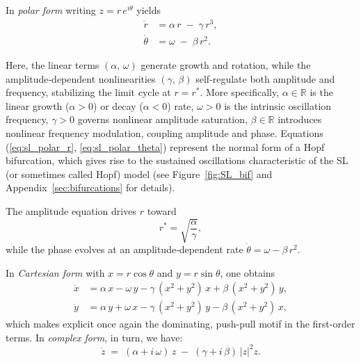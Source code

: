 \documentclass[11pt]{article}
\numberwithin{equation}{section}
\begin{document}
In \textit{polar form} writing \(z = r\,e^{i\theta}\) yields
\begin{align}
  \dot{r}      &= \alpha\,r \;-\; \gamma\,r^{3}, 
  \label{eq:sl_polar_r}\\
  \dot{\theta} &= \omega \;-\; \beta\,r^{2}.
  \label{eq:sl_polar_theta}
\end{align}

Here, the linear terms \((\alpha,\,\omega)\) generate growth and rotation, while the amplitude‐dependent nonlinearities \((\gamma,\,\beta)\) self‐regulate both amplitude and frequency, stabilizing the limit cycle at \(r=r^{*}\). More specifically, \(\alpha\in\mathbb{R}\) is the linear growth (\(\alpha>0\)) or decay (\(\alpha<0\)) rate, \(\omega>0\) is the intrinsic oscillation frequency, \(\gamma>0\) governs nonlinear amplitude saturation, \(\beta\in\mathbb{R}\) introduces nonlinear frequency modulation, coupling amplitude and phase. Equations (\eqref{eq:sl_polar_r}, \eqref{eq:sl_polar_theta}) represent the normal form of a Hopf bifurcation\cite{kuznecovElementsAppliedBifurcation1995}, which gives rise to the sustained oscillations characteristic of the SL (or sometimes called Hopf) model (see Figure~\ref{fig:SL_bif} and Appendix~\ref{sec:bifurcations} for details).

The amplitude equation drives \(r\) toward
\begin{equation}
  r^{*} = \sqrt{\frac{\alpha}{\gamma}},
\end{equation}
while the phase evolves at an amplitude‐dependent rate \( \dot\theta = \omega - \beta\,r^{2}\).

In \textit{Cartesian form}
with \(x = r\cos\theta\) and \(y = r\sin\theta\), one obtains
\begin{align}
  \dot{x} &= \alpha\,x - \omega\,y
           - \gamma\,(x^{2}+y^{2})\,x
           + \beta\,(x^{2}+y^{2})\,y,
  \label{eq:sl_cart_x}\\
  \dot{y} &= \alpha\,y + \omega\,x
           - \gamma\,(x^{2}+y^{2})\,y
           - \beta\,(x^{2}+y^{2})\,x,
  \label{eq:sl_cart_y}
\end{align}
which makes explicit once again the dominating,  push-pull motif in the first-order terms.
In \textit{complex form}, in turn, we have:
\begin{equation}
\dot{z} \;=\; (\alpha + i\,\omega)\,z \;-\; (\gamma + i\,\beta)\,\lvert z\rvert^{2}z.
\end{equation}
\end{document}
